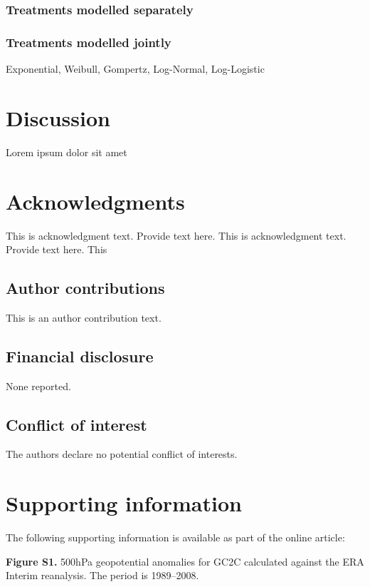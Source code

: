 \documentclass[AMA,STIX1COL]{WileyNJD-v2}
\begin{document}
\subsubsection{Treatments modelled separately}
\subsubsection{Treatments modelled jointly}

Exponential, Weibull, Gompertz, Log-Normal, Log-Logistic




\section{Discussion}\label{sec:discussion}

Lorem ipsum dolor sit amet


\section*{Acknowledgments}
This is acknowledgment text.\cite{Kenamond2013} Provide text here. This is acknowledgment text. Provide text here. This 
\subsection*{Author contributions}

This is an author contribution text.

\subsection*{Financial disclosure}

None reported.

\subsection*{Conflict of interest}

The authors declare no potential conflict of interests.


\section*{Supporting information}

The following supporting information is available as part of the online article:

\noindent
\textbf{Figure S1.}
{500{\uns}hPa geopotential anomalies for GC2C calculated against the ERA Interim reanalysis. The period is 1989--2008.}
\end{document}
